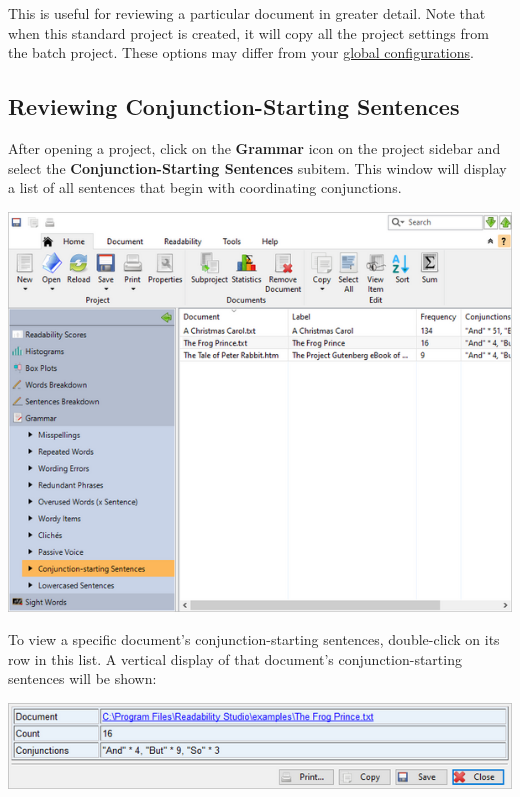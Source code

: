 \documentclass[
]{book}
\theoremstyle{definition}
\theoremstyle{definition}
\theoremstyle{definition}
\theoremstyle{definition}
\theoremstyle{remark}
\begin{document}
This is useful for reviewing a particular document in greater detail. Note that when this standard project is created, it will copy all the project settings from the batch project. These options may differ from your \protect\hyperlink{options-overview}{global configurations}.

\hypertarget{reviewing-batch-conjunction-sentences}{%
\subsection*{Reviewing Conjunction-Starting Sentences}\label{reviewing-batch-conjunction-sentences}}

After opening a project, click on the \textbf{Grammar} icon on the project sidebar and select the \textbf{Conjunction-Starting Sentences} subitem. This window will display a list of all sentences that begin with coordinating conjunctions.

\includegraphics{Images/batchconjunctionstart.png}

To view a specific document's conjunction-starting sentences, double-click on its row in this list. A vertical display of that document's conjunction-starting sentences will be shown:

\includegraphics{Images/batchconjunctionviewitem.png}
\end{document}
